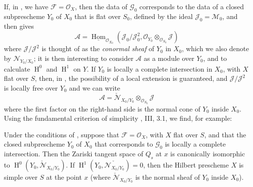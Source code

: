 If, in , we have $\mathcal{F}=\mathcal{O}_X$, then the data of $\mathcal{G}_0$ corresponds to the data of a closed subprescheme $Y_0$ of $X_0$ that is flat over $S_0$, defined by the ideal $\mathcal{J}_0=\mathcal{M}_0$, and then  gives
\[
  \mathcal{A}
  = \underline{\operatorname{Hom}}_{\mathcal{O}_{X_0}}(\mathcal{J}_0/\mathcal{J}_0^2,\mathcal{O}_{Y_0}\otimes_{\mathcal{O}_{S_0}}\mathcal{J})
\]
where $\mathcal{J}/\mathcal{J}^2$ is thought of as the \emph{conormal sheaf} of $Y_0$ in $X_0$, which we also denote by $\mathcal{N}_{Y_0/X_0}$;
it is then interesting to consider $\mathcal{A}$ as a module over $Y_0$, and to calculate $\operatorname{H}^0$ and $\operatorname{H}^1$ on $Y$.
If $Y_0$ is locally a complete intersection in $X_0$, with $X$ flat over $S$, then, in , the possibility of a local extension is guaranteed, and $\mathcal{J}/\mathcal{J}^2$ is locally free over $Y_0$ and we can write
\[
  \mathcal{A} = \check{\mathcal{N}}_{X_0/Y_0}\otimes_{\mathcal{O}_{S_0}}\mathcal{J}
\]
where the first factor on the right-hand side is the normal cone of $Y_0$ inside $X_0$.
Using the fundamental criterion of simplicity \cite{Gro1960b}, III, 3.1, we find, for example:


\begin{corollary}\label{fga3.iv-5-corollary-5.4}
  Under the conditions of , suppose that $\mathcal{F}=\mathcal{O}_X$, with $X$ flat over $S$, and that the closed subprescheme $Y_0$ of $X_0$ that corresponds to $\mathcal{G}_0$ is locally a complete intersection.
  Then the Zariski tangent space of $Q_s$ at $x$ is canonically isomorphic to $\operatorname{H}^0(Y_0,\check{\mathcal{N}}_{X_0/Y_0})$.
  If $\operatorname{H}^1(Y_0,\check{\mathcal{N}_{X_0/Y_0}})=0$, then the Hilbert prescheme $X$ is simple over $S$ at the point $x$ (where $\check{\mathcal{N}}_{X_0/Y_0}$ is the normal sheaf of $Y_0$ inside $X_0$).
\end{corollary}

